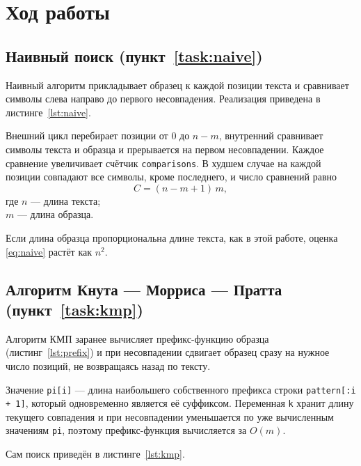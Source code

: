 \section{Ход работы}

\subsection{Наивный поиск (пункт~\ref{task:naive})}
Наивный алгоритм прикладывает образец к каждой позиции текста и сравнивает символы слева
направо до первого несовпадения. Реализация приведена в листинге~\ref{lst:naive}.


Внешний цикл перебирает позиции от 0 до $n - m$, внутренний сравнивает символы текста и
образца и прерывается на первом несовпадении. Каждое сравнение увеличивает счётчик
\texttt{comparisons}. В худшем случае на каждой позиции совпадают все символы, кроме
последнего, и число сравнений равно
\begin{equation}\label{eq:naive}
  C = (n - m + 1)\, m,
\end{equation}
где $n$ — длина текста;\\
$m$ — длина образца.

Если длина образца пропорциональна длине текста, как в этой работе, оценка
\eqref{eq:naive} растёт как $n^2$.

\subsection{Алгоритм Кнута — Морриса — Пратта (пункт~\ref{task:kmp})}
Алгоритм КМП заранее вычисляет префикс-функцию образца (листинг~\ref{lst:prefix}) и при
несовпадении сдвигает образец сразу на нужное число позиций, не возвращаясь назад по тексту.


Значение \texttt{pi[i]} — длина наибольшего собственного префикса строки
\texttt{pattern[:i + 1]}, который одновременно является её суффиксом. Переменная \texttt{k}
хранит длину текущего совпадения и при несовпадении уменьшается по уже вычисленным
значениям \texttt{pi}, поэтому префикс-функция вычисляется за $O(m)$.

Сам поиск приведён в листинге~\ref{lst:kmp}.


